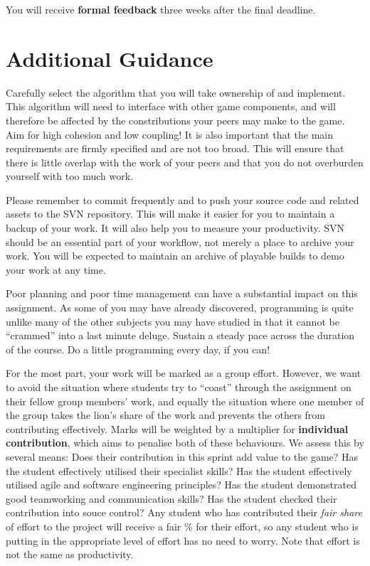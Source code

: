 \documentclass{../fal_assignment}
\begin{document}
You will receive \textbf{formal feedback} three weeks after the final deadline.


\section*{Additional Guidance}

Carefully select the algorithm that you will take ownership of and implement. This algorithm will need to interface with other game components, and will therefore be affected by the constributions your peers may make to the game. Aim for high cohesion and low coupling! It is also important that the main requirements are firmly specified and are not too broad. This will ensure that there is little overlap with the work of your peers and that you do not overburden yourself with too much work. 

Please remember to commit frequently and to push your source code and related assets to the SVN repository. This will make it easier for you to maintain a backup of your work. It will also help you to measure your productivity. SVN should be an essential part of your workflow, not merely a place to archive your work. You will be expected to maintain an archive of playable builds to demo your work at any time.

Poor planning and poor time management can have a substantial impact on this assignment. As some of you may have already discovered, programming is quite unlike many of the other subjects you may have studied in that it cannot be ``crammed'' into a last minute deluge. Sustain a steady pace across the duration of the course. Do a little programming every day, if you can!

For the most part, your work will be marked as a group effort.
However, we want to avoid the situation where students try to ``coast'' through the assignment
on their fellow group members' work,
and equally the situation where one member of the group takes the lion's share of the work
and prevents the others from contributing effectively.
Marks will be weighted by a multiplier for \textbf{individual contribution},
which aims to penalise both of these behaviours.
We assess this by several means: Does their contribution in this sprint add value to the game? Has the student effectively utilised their specialist skills? Has the student effectively utilised agile and software engineering principles? Has the student demonstrated good teamworking and communication skills? Has the student checked their contribution into souce control? Any student who has contributed their \textit{fair share} of effort to the project will receive a fair \% for their effort,
so any student who is putting in the appropriate level of effort has no need to worry. Note that effort is not the same as productivity.
\end{document}
